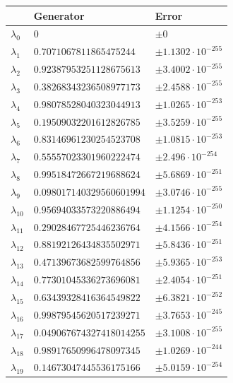 \documentclass[a4paper,10pt]{article}
\begin{document}
\begin{appendix}
\begin{table}
  \centering
  \begin{tabular}{|l|ll|}
  \hline
  {}             & Generator                 & Error \\
  \hline
  $\lambda_{0}$  & $0$                       &  $\pm 0$ \\
  $\lambda_{1}$  & $0.7071067811865475244$   &  $\pm 1.1302 \cdot 10^{-255}$ \\
  $\lambda_{2}$  & $0.92387953251128675613$  &  $\pm 3.4002 \cdot 10^{-255}$ \\
  $\lambda_{3}$  & $0.38268343236508977173$  &  $\pm 2.4588 \cdot 10^{-255}$ \\
  $\lambda_{4}$  & $0.98078528040323044913$  &  $\pm 1.0265 \cdot 10^{-253}$ \\
  $\lambda_{5}$  & $0.19509032201612826785$  &  $\pm 3.5259 \cdot 10^{-255}$ \\
  $\lambda_{6}$  & $0.83146961230254523708$  &  $\pm 1.0815 \cdot 10^{-253}$ \\
  $\lambda_{7}$  & $0.55557023301960222474$  &  $\pm 2.496 \cdot 10^{-254}$ \\
  $\lambda_{8}$  & $0.99518472667219688624$  &  $\pm 5.6869 \cdot 10^{-251}$ \\
  $\lambda_{9}$  & $0.098017140329560601994$ &  $\pm 3.0746 \cdot 10^{-255}$ \\
  $\lambda_{10}$ & $0.95694033573220886494$  &  $\pm 1.1254 \cdot 10^{-250}$ \\
  $\lambda_{11}$ & $0.29028467725446236764$  &  $\pm 4.1566 \cdot 10^{-254}$ \\
  $\lambda_{12}$ & $0.88192126434835502971$  &  $\pm 5.8436 \cdot 10^{-251}$ \\
  $\lambda_{13}$ & $0.47139673682599764856$  &  $\pm 5.9365 \cdot 10^{-253}$ \\
  $\lambda_{14}$ & $0.77301045336273696081$  &  $\pm 2.4054 \cdot 10^{-251}$ \\
  $\lambda_{15}$ & $0.63439328416364549822$  &  $\pm 6.3821 \cdot 10^{-252}$ \\
  $\lambda_{16}$ & $0.99879545620517239271$  &  $\pm 3.7653 \cdot 10^{-245}$ \\
  $\lambda_{17}$ & $0.049067674327418014255$ &  $\pm 3.1008 \cdot 10^{-255}$ \\
  $\lambda_{18}$ & $0.98917650996478097345$  &  $\pm 1.0269 \cdot 10^{-244}$ \\
  $\lambda_{19}$ & $0.14673047445536175166$  &  $\pm 5.0159 \cdot 10^{-254}$ \\

\end{tabular}
\end{table}
\end{appendix}
\end{document}
